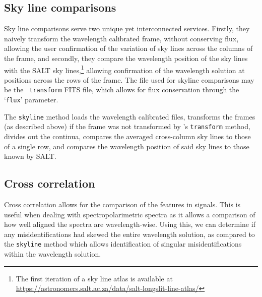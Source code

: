 \subsection{Sky line comparisons}

Sky line comparisons serve two unique yet interconnected services. Firstly, they naively transform the wavelength calibrated frame, without conserving flux, allowing the user confirmation of the variation of sky lines across the columns of the frame, and secondly, they compare the wavelength position of the sky lines with the \gls{SALT} sky lines,\footnote{The first iteration of a sky line atlas is available at \url{https://astronomers.salt.ac.za/data/salt-longslit-line-atlas/}} allowing confirmation of the wavelength solution at positions across the rows of the frame. The file used for skyline comparisons may be the \iraf\ \texttt{transform} \gls{FITS} file, which allows for flux conservation through the `\texttt{flux}' parameter.
\prgph

The \texttt{skyline} method loads the wavelength calibrated files, transforms the frames (as described above) if the frame was not transformed by \iraf's \texttt{transform} method, divides out the continua, compares the averaged cross-column sky lines to those of a single row, and compares the wavelength position of said sky lines to those known by \gls{SALT}.




\subsection{Cross correlation}

Cross correlation allows for the comparison of the features in signals. This is useful when dealing with spectropolarimetric spectra as it allows a comparison of how well aligned the spectra are wavelength-wise. Using this, we can determine if any misidentifications had skewed the entire wavelength solution, as compared to the \texttt{skyline} method which allows identification of singular misidentifications within the wavelength solution.
\prgph





